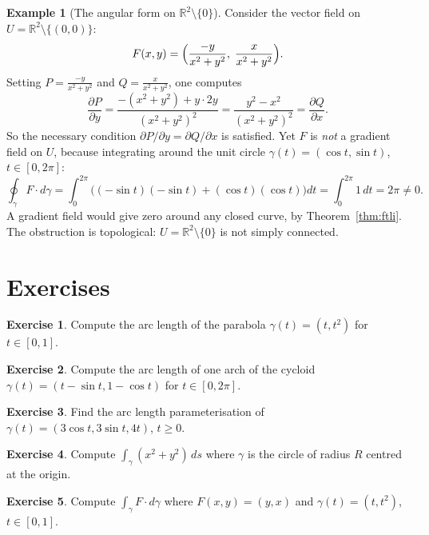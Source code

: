 \documentclass[12pt,a4paper]{book}
\theoremstyle{definition}
\newtheorem{example}{Example}[chapter]
\newtheorem{exercise}{Exercise}[chapter]
\begin{document}
\begin{example}[The angular form on $\mathbb{R}^2\setminus\{0\}$]
\label{ex:angular-form}
Consider the vector field on $U=\mathbb{R}^2\setminus\{(0,0)\}$:
\[
  F(x,y) = \Bigl(\frac{-y}{x^2+y^2},\;\frac{x}{x^2+y^2}\Bigr).
\]
Setting $P=\frac{-y}{x^2+y^2}$ and $Q=\frac{x}{x^2+y^2}$, one computes
\[
  \frac{\partial P}{\partial y}
  = \frac{-(x^2+y^2)+y\cdot 2y}{(x^2+y^2)^2}
  = \frac{y^2-x^2}{(x^2+y^2)^2}
  = \frac{\partial Q}{\partial x}.
\]
So the necessary condition $\partial P/\partial y=\partial Q/\partial x$ is
satisfied.  Yet $F$ is \emph{not} a gradient field on $U$, because
integrating around the unit circle $\gamma(t)=(\cos t,\sin t)$,
$t\in[0,2\pi]$:
\[
  \oint_\gamma F\cdot d\gamma
  = \int_0^{2\pi}\bigl((-\sin t)(-\sin t)+(\cos t)(\cos t)\bigr)dt
  = \int_0^{2\pi}1\,dt = 2\pi \ne 0.
\]
A gradient field would give zero around any closed curve, by
Theorem~\ref{thm:ftli}.  The obstruction is topological:
$U=\mathbb{R}^2\setminus\{0\}$ is not simply connected.
\end{example}

\section{Exercises}
\label{sec:ex-ch11}

\begin{exercise}
Compute the arc length of the parabola $\gamma(t)=(t,t^2)$ for
$t\in[0,1]$.
\end{exercise}

\begin{exercise}
Compute the arc length of one arch of the cycloid
$\gamma(t)=(t-\sin t,1-\cos t)$ for $t\in[0,2\pi]$.
\end{exercise}

\begin{exercise}
Find the arc length parameterisation of $\gamma(t)=(3\cos t,3\sin t,4t)$,
$t\ge 0$.
\end{exercise}

\begin{exercise}
Compute $\int_\gamma (x^2+y^2)\,ds$ where $\gamma$ is the circle of radius
$R$ centred at the origin.
\end{exercise}

\begin{exercise}
Compute $\int_\gamma F\cdot d\gamma$ where $F(x,y)=(y,x)$ and
$\gamma(t)=(t,t^2)$, $t\in[0,1]$.
\end{exercise}
\end{document}
